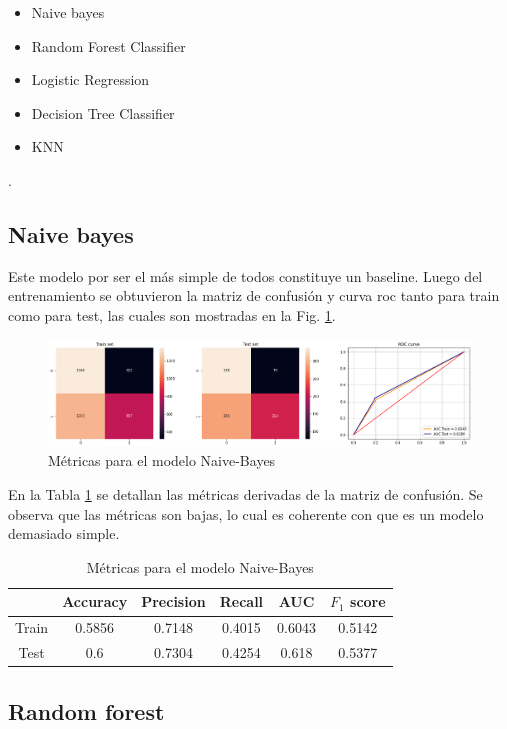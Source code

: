 \begin{itemize}
\item Naive bayes
\item Random Forest Classifier
\item Logistic Regression
\item Decision Tree Classifier
\item KNN
\end{itemize}.


\subsection{Naive bayes}

Este modelo por ser el más simple de todos constituye un baseline. Luego del entrenamiento se obtuvieron la matriz de confusión y curva roc tanto para train como para test, las cuales son mostradas en la Fig. \ref{fig.naive}. 

\begin{figure}[H]
\centering
        \includegraphics[width=\linewidth]{chapters/deteccion/images/naive.png}
        \caption{Métricas para el modelo Naive-Bayes}
        \label{fig.naive}
  \end{figure}
  
  En la Tabla \ref{tabla.naive} se detallan las métricas derivadas de la matriz de confusión. Se observa que las métricas son bajas, lo cual es coherente con que es un modelo demasiado simple. 

\begin{table}[H]
\centering
\begin{tabular}{|c|c|c|c|c|c|}
\hline
      & Accuracy & Precision & Recall & AUC    & $F_1$ score \\ \hline
Train & 0.5856   & 0.7148    & 0.4015 & 0.6043 & 0.5142      \\ \hline
Test  & 0.6      & 0.7304    & 0.4254 & 0.618  & 0.5377      \\ \hline
\end{tabular}
\caption{Métricas para el modelo Naive-Bayes}
\label{tabla.naive}
\end{table}

\subsection{Random forest}

